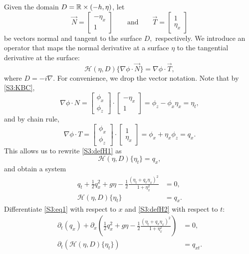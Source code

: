Given the domain $D = \mathbb R \times (-h, \eta)$, let 
\[  
\vec{N} = \begin{bmatrix} -\eta_x \\ 1 \end{bmatrix} \qquad
\mbox{and} \qquad
\vec{T} =\begin{bmatrix} 1 \\ \eta_x \end{bmatrix} \]
be vectors normal and tangent to the surface $D,$ respectively. We introduce an operator that maps the normal derivative at a surface $\eta$ to the tangential derivative at the surface:
\begin{equation}\label{S3:defH1}
\mathcal{H}(\eta, D) \{ \nabla \phi \cdot \vec{N} \} = \nabla \phi \cdot \vec{T},
\end{equation}
where $D = - i \nabla.$ For convenience, we drop the vector notation. Note that by \eqref{S3:KBC}, 
\[ 
\nabla \phi \cdot N = \begin{bmatrix} \phi_x \\ \phi_z \end{bmatrix} \cdot \begin{bmatrix} -\eta_x \\ 1 \end{bmatrix} = \phi_z - \phi_x \eta_x = \eta_t,
\] 
and by chain rule,
\[ 
\nabla \phi \cdot T = \begin{bmatrix} \phi_x \\ \phi_z \end{bmatrix} \cdot \begin{bmatrix} 1 \\ \eta_x \end{bmatrix} = \phi_x + \eta_x \phi_z = q_x.
\]
This allows us to rewrite \eqref{S3:defH1} as 
\begin{equation}\label{S3:defH2}
\mathcal{H}(\eta, D) \{ \eta_t \} = q_x,
\end{equation}
and obtain a system
\begin{align*}
q_t + \frac{1}{2}q_x^2 + g \eta - \frac{1}{2} \frac{(\eta_t + q_x \eta_x)^2}{1 + \eta_x^2} &= 0, \\
\mathcal{H}(\eta, D) \{ \eta_t \} &= q_x.
\end{align*}
Differentiate \eqref{S3:eq1} with respect to $x$ and \eqref{S3:defH2} with respect to $t:$
\begin{align}
\partial_t(q_x) + \partial_x\left(\frac{1}{2}q_x^2 + g \eta - \frac{1}{2} \frac{(\eta_t + q_x \eta_x)^2}{1 + \eta_x^2}\right) &= 0, \label{S3:eq2} \\
\partial_t(\mathcal{H}(\eta, D) \{ \eta_t \}) &= q_{xt}. \label{S3:defH3}
\end{align}
